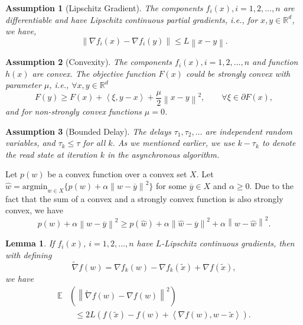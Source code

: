 \documentclass[letterpaper]{article} %
\newcommand*{\R}{\mathbb{R}}
\newcommand*{\E}{\mathbb{E}}
\newcommand{\norm}[1]{\left\lVert#1\right\rVert}
\newcommand{\Iprod}[2]{\left\langle #1,#2\right\rangle}
\newtheorem{lemma}{Lemma}
\newtheorem{Assumption}{Assumption}
\begin{document}
\begin{Assumption}[Lipschitz Gradient]\label{Assump1}
The components $f_i(x), i=1,2,\ldots,n$ are differentiable and have Lipschitz continuous partial gradients, i.e., for $x,y\in \R^d$, we have,
\begin{equation}
    \norm{\nabla f_i(x) - \nabla f_i(y)} \leq L \norm{x-y}.
\end{equation}
\end{Assumption}
\begin{Assumption}[Convexity]\label{Assump2}
The components $f_i(x), i=1,2,\ldots,n$ and function $h(x)$ are convex. The objective function $F(x)$ could be strongly convex with parameter $\mu$, i.e., 
$\forall x,y \in \R^d$
\begin{equation}\label{Convex:Eq1}
F(y)\geq F(x) + \Iprod{\xi}{y-x} + \frac{\mu}{2}\norm{x-y}^2,\qquad \forall \xi\in\partial F(x),
\end{equation}
and for non-strongly convex functions $\mu=0$. 
\end{Assumption}

\begin{Assumption}[Bounded Delay]\label{Assump3}
The delays $\tau_1,\tau_2,\ldots$ are independent random variables, and $\tau_k\leq \tau$ for all $k$. As we mentioned earlier, we use $k-\tau_k$ to denote the read state at iteration $k$ in the asynchronous algorithm.
\end{Assumption}

Let $p(w)$ be a convex function over a convex set $X$. Let $\hat{w} = \text{argmin}_{w\in X}\{p(w)+\alpha\norm{w-\overline{y}}^2\}$ for some $\overline{y}\in X$ and $\alpha\geq 0$. Due to the fact that the sum of a convex and a strongly convex function is also strongly convex,  we have
\begin{equation}\label{threepoint-convex}
 p(w)+\alpha\norm{w-\overline{y}}^2 \geq p(\hat{w})+\alpha\norm{\hat{w}-\overline{y}}^2+\alpha\norm{w-\hat{w}}^2.
\end{equation}


\begin{lemma}\label{lemma0}\cite{Johnson12,Allen-Zhu17} If $f_i(x)$, $i=1,2,\ldots,n$ have $L$-Lipschitz continuous gradients, then with defining 
\[
\widetilde{\nabla} f(w) = \nabla f_k(w) - \nabla f_k(\widetilde{x})+ \nabla f(\widetilde{x}),
\]
we have
\begin{equation}
\begin{split}
\E&\left(\norm{\widetilde{\nabla} f(w)-\nabla f(w)}^2\right)\\
&~~~\leq 2L (f(\widetilde{x})-f(w)+\Iprod{\nabla f(w)}{w-\widetilde{x}}).
\end{split}
\end{equation}
\end{lemma}
\end{document}
